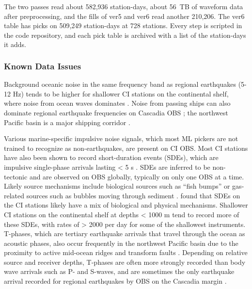 \documentclass[review]{seismica}
\begin{document}
The two passes read about 582,936 station-days, about 56~TB of waveform
data after preprocessing, and the fills of ver5 and ver6 read another
210,206. The ver6 table has picks on 509,249 station-days at 728
stations. Every step is scripted in the code repository, and each pick
table is archived with a list of the station-days it adds.

\subsubsection{Known Data Issues}\label{known-data-issues}

Background oceanic noise in the same frequency band as regional
earthquakes (5-12 Hz) tends to be higher for shallower CI stations on
the continental shelf, where noise from ocean waves dominates
\citep{hilmo_wilcock_2020}. Noise from passing ships can also dominate
regional earthquake frequencies on Cascadia OBS \citep{krauss25}; the
northwest Pacific basin is a major shipping corridor
\citep{dahl_trends_2021}.

Various marine-specific impulsive noise signals, which most ML pickers
are not trained to recognize as non-earthquakes, are present on CI OBS.
Most CI stations have also been shown to record short-duration events
(SDEs), which are impulsive single-phase arrivals lasting \textless{} 5
s \citep{hilmo_wilcock_2020, macleod_nonseismic_2025}. SDEs are inferred
to be non-tectonic and are observed on OBS globally, typically on only
one OBS at a time. Likely source mechanisms include biological sources
such as ``fish bumps'' or gas-related sources such as bubbles moving
through sediment \citep{batsi_nonseismic_2019, tary_atypical_2024}.
\citet{MacLeod25} found that SDEs on the CI stations likely have a mix
of biological and physical mechanisms. Shallower CI stations on the
continental shelf at depths \textless{} 1000 m tend to record more of
these SDEs, with rates of \textgreater{} 2000 per day for some of the
shallowest instruments. T-phases, which are tertiary earthquake arrivals
that travel through the ocean as acoustic phases, also occur frequently
in the northwest Pacific basin due to the proximity to active mid-ocean
ridges and transform faults
\citep{dziak_20-year_2011, shen_ocean_2024, liu_automatic_2025, krauss25}.
Depending on relative source and receiver depths, T-phases are often
more strongly recorded than body wave arrivals such as P- and S-waves,
and are sometimes the only earthquake arrival recorded for regional
earthquakes by OBS on the Cascadia margin \citep{krauss25}.
\end{document}
